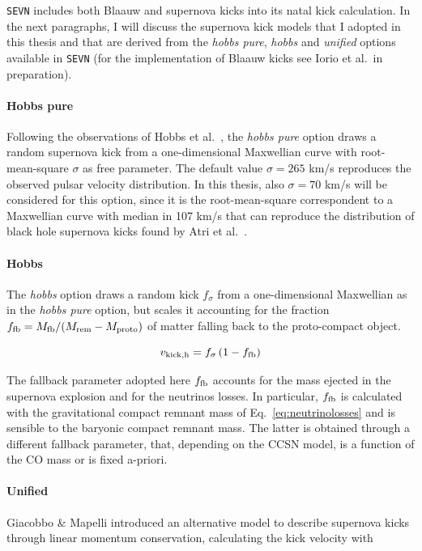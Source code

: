 \documentclass[a4paper,titlepage]{book}     	%
\begin{document}
\texttt{SEVN} includes both Blaauw and supernova kicks into its natal kick calculation. In the next paragraphs, I will discuss the supernova kick models that I adopted in this thesis and that are derived from the \emph{hobbs pure}, \emph{hobbs} and \emph{unified} options available in \texttt{SEVN} (for the implementation of Blaauw kicks see Iorio et al.\ in preparation).


\paragraph{Hobbs pure } Following the  observations of Hobbs et al.\ \cite{Hobbs2005}, the \emph{hobbs pure} option draws a random supernova kick from a one-dimensional Maxwellian curve with root-mean-square $\sigma$ as free parameter. The default value $\sigma = 265$ km/s reproduces the observed pulsar velocity distribution. In this thesis, also $\sigma = 70$ km/s will be considered for this option, since it is the root-mean-square correspondent to a Maxwellian curve with median in 107 km/s that can reproduce the distribution of black hole supernova kicks found by Atri et al.\ \cite{Atri2019_kicks}.

\paragraph{Hobbs} The \emph{hobbs} option draws a random kick $f_{\sigma}$ from a one-dimensional Maxwellian as in the \emph{hobbs pure} option, but scales it accounting for the fraction $f_{\rm fb}=M_{\rm fb}/(M_{\rm rem} - M_{\rm proto})$ of matter falling back to the proto-compact object.

\begin{equation}\label{eq:kickhobbs}
    v_{\rm kick, h} = f_\sigma\,{} (1-f_{\rm fb}) 
\end{equation}

The fallback parameter adopted here $f_{\rm fb}$ accounts for the mass ejected in the supernova explosion and for the neutrinos losses. In particular, $f_{\rm fb}$ is calculated with the gravitational compact remnant mass of Eq.\ \ref{eq:neutrinolosses} and is sensible to the baryonic compact remnant mass. The latter is obtained through a different fallback parameter, that, depending on the CCSN model, is a function of the CO mass or is fixed a-priori.


\paragraph{Unified}  Giacobbo \& Mapelli \cite{SNkicksUnified_Giacobbo2020} introduced an alternative model to describe supernova kicks through linear momentum conservation, calculating the kick velocity with
\end{document}
